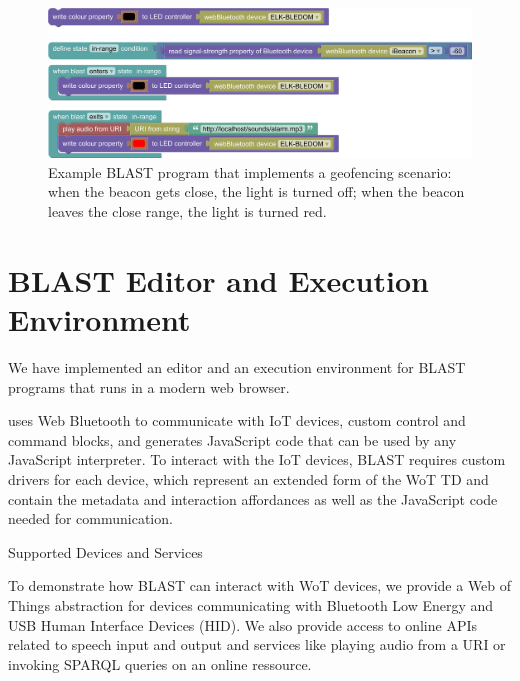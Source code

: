 \documentclass[runningheads]{llncs}
\begin{document}
\begin{figure}
\includegraphics[width=\textwidth]{screenshot 3.png}%
\caption{Example BLAST program that implements a geofencing scenario: when the beacon gets close, the light is turned off; when the beacon leaves the close range, the light is turned red.} \label{fig1}
\end{figure}

\section{BLAST Editor and Execution Environment}

We have implemented an editor and an execution environment for BLAST programs that runs in a modern web browser.


uses Web Bluetooth to communicate with IoT devices, custom control and command blocks, and generates JavaScript code that can be used by any JavaScript interpreter.
To interact with the IoT devices, BLAST requires custom drivers for each device, which represent an extended form of the WoT TD %
and contain the metadata and interaction affordances as well as the JavaScript code needed for communication.

Supported Devices and Services

To demonstrate how BLAST can interact with WoT devices, we provide a Web of Things abstraction for devices communicating with Bluetooth Low Energy and USB Human Interface Devices (HID).
We also provide access to online APIs related to speech input and output and services like playing audio from a URI or invoking SPARQL queries on an online ressource.
\end{document}
